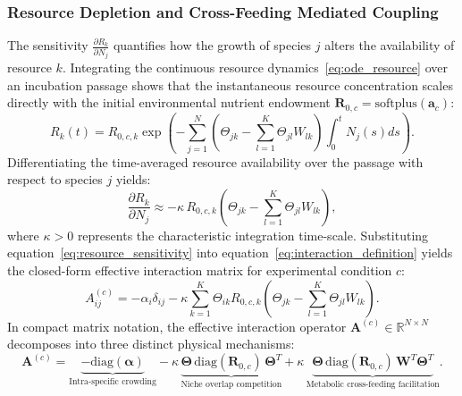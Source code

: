 \subsubsection{Resource Depletion and Cross-Feeding Mediated Coupling}
The sensitivity $\frac{\partial R_k}{\partial N_j}$ quantifies how the growth of species $j$ alters the availability of resource $k$. Integrating the continuous resource dynamics~\eqref{eq:ode_resource} over an incubation passage shows that the instantaneous resource concentration scales directly with the initial environmental nutrient endowment $\mathbf{R}_{0, c} = \text{softplus}(\mathbf{a}_c)$:
\begin{equation}
    R_k(t) = R_{0, c, k} \exp\left( - \sum_{j=1}^N \left( \Theta_{jk} - \sum_{l=1}^K \Theta_{jl} W_{lk} \right) \int_0^t N_j(s) ds \right).
\end{equation}
Differentiating the time-averaged resource availability over the passage with respect to species $j$ yields:
\begin{equation}
    \label{eq:resource_sensitivity}
    \frac{\partial R_k}{\partial N_j} \approx - \kappa \, R_{0, c, k} \left( \Theta_{jk} - \sum_{l=1}^K \Theta_{jl} W_{lk} \right),
\end{equation}
where $\kappa > 0$ represents the characteristic integration time-scale. Substituting equation~\eqref{eq:resource_sensitivity} into equation~\eqref{eq:interaction_definition} yields the closed-form effective interaction matrix for experimental condition $c$:
\begin{equation}
    \label{eq:interaction_matrix_component}
    A_{ij}^{(c)} = - \alpha_i \delta_{ij} - \kappa \sum_{k=1}^K \Theta_{ik} R_{0, c, k} \left( \Theta_{jk} - \sum_{l=1}^K \Theta_{jl} W_{lk} \right).
\end{equation}
In compact matrix notation, the effective interaction operator $\mathbf{A}^{(c)} \in \mathbb{R}^{N \times N}$ decomposes into three distinct physical mechanisms:
\begin{equation}
    \label{eq:interaction_matrix_closed_form}
    \mathbf{A}^{(c)} = \underbrace{- \text{diag}(\mathbf{\alpha})}_{\text{Intra-specific crowding}} - \kappa \, \underbrace{\mathbf{\Theta} \, \text{diag}(\mathbf{R}_{0, c}) \, \mathbf{\Theta}^T}_{\text{Niche overlap competition}} + \kappa \, \underbrace{\mathbf{\Theta} \, \text{diag}(\mathbf{R}_{0, c}) \, \mathbf{W}^T \mathbf{\Theta}^T}_{\text{Metabolic cross-feeding facilitation}}.
\end{equation}


